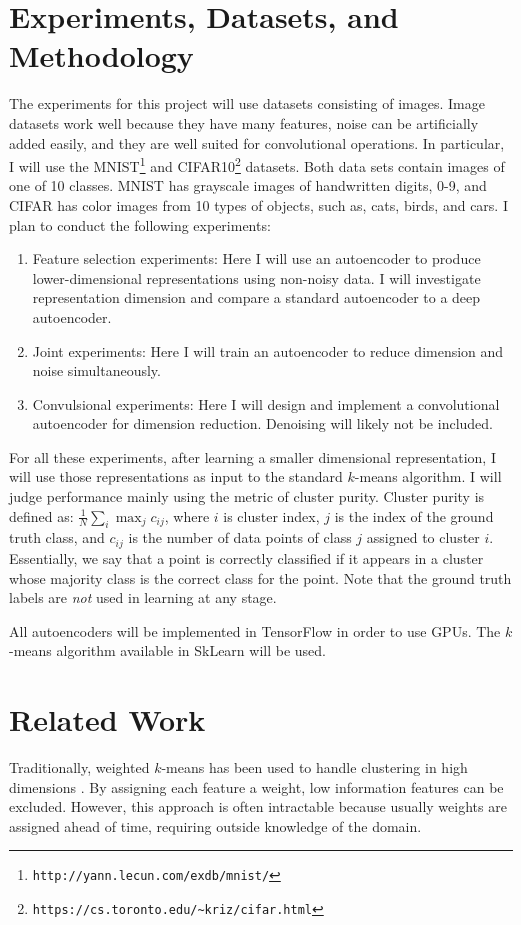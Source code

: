 \documentclass[10pt,twocolumn]{article}
\begin{document}
\vspace{-5mm} \section{Experiments,  Datasets, and Methodology} \vspace{-5mm}
The experiments for this project will use datasets consisting of images. Image datasets work well because they have many features, noise can be artificially added easily, and they are well suited for convolutional operations. In particular, I will use the MNIST\footnote{\texttt{http://yann.lecun.com/exdb/mnist/}} and CIFAR10\footnote{\texttt{https://cs.toronto.edu/\textasciitilde kriz/cifar.html}} datasets. Both data sets contain images of one of 10 classes. MNIST has grayscale images of handwritten digits, 0-9, and CIFAR has color images from 10 types of objects, such as, cats, birds, and cars. I  plan to conduct the following experiments:
\begin{enumerate}
	\item Feature selection experiments: Here I will use an autoencoder to produce lower-dimensional representations using non-noisy data. I will investigate representation dimension and compare a standard autoencoder to a deep autoencoder.
	\item Joint experiments: Here I will train an autoencoder to reduce dimension and noise simultaneously. 
	\item Convulsional experiments: Here I will design and implement a convolutional autoencoder for dimension reduction. Denoising will likely not be included.
\end{enumerate} 
For all these experiments, after learning a smaller dimensional representation, I will use those representations as input to the standard $k$-means algorithm.  I will judge performance mainly using the metric of cluster purity. Cluster purity is defined as: $\frac{1}{N} \sum_i \max_{j} c_{ij}$, where $i$ is cluster index, $j$ is the index of the ground truth class, and $c_{ij}$ is the number of data points of class $j$ assigned to cluster $i$. Essentially, we say that a point is correctly classified if it appears in a cluster whose majority class is the correct class for the point. Note that the ground truth labels are \textit{not} used in learning at any stage. 

All autoencoders will be implemented in TensorFlow in order to use GPUs. The $k$-means algorithm available in SkLearn will be used.

\pagebreak
\vspace{-5mm} \section{Related Work} \vspace{-5mm}
Traditionally, weighted $k$-means has been used to handle clustering in high dimensions \cite{weighted}. By assigning each feature a weight, low information features can be excluded. However, this approach is often intractable because usually weights are assigned ahead of time, requiring outside knowledge of the domain.  
\end{document}

